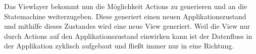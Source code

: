 Das Viewlayer bekommt nun die Möglichkeit Actions zu generieren und an die
Statemachine weiterzugeben. Diese generiert einen neuen Applikationszustand und
mithilfe dieses Zustandes wird eine neue View generiert. Weil die View nur durch
Actions auf den Applikationszustand einwirken kann ist der Datenfluss in der
Applikation zyklisch aufgebaut und fließt immer nur in eine Richtung.

